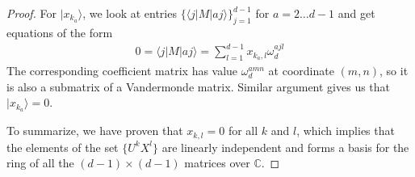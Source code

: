 \documentclass[11pt,letterpaper]{article}
\newcommand{\ket}[1]{|#1\rangle}
\newcommand{\bra}[1]{\langle#1|}
\newcommand{\ketbra}[2]{|#1\rangle\langle#2|}
\newcommand{\C}{\mathbb{C}}
\newcommand{\1}{\mathbb{1}}
\newcommand{\Pg}{\mathcal{P}}
\newcommand{\J}{\mathcal{J}}
\newcommand{\paulix}{\sigma_x}
\newcommand{\pauliz}{\sigma_z}
\newcommand{\G}[1]{G^{(#1)}}
\newcommand{\LS}{LS}
\theoremstyle{definition}
\begin{document}
\begin{proof}
For $\ket{x_{k_a}}$, we look at entries $\{\bra{j}M\ket{aj}\}_{j=1}^{d-1}$ for $a = 2 \dots d-1$ and get equations
of the form
\begin{align}
	0 = \bra{j}M\ket{aj} = \sum_{l=1}^{d-1} x_{k_a, l} \omega_d^{ajl} 
\end{align}
The corresponding coefficient matrix has value $\omega_d^{amn}$ at coordinate $(m,n)$,
so it is also a submatrix of a Vandermonde matrix. Similar argument gives us that $\ket{x_{k_a}} = 0$.

To summarize, we have proven that $x_{k,l} = 0$ for all $k$ and $l$, which implies that the elements of the set
$\{ U^k X^l \}$ are linearly independent and forms a basis for the ring of all the $(d-1)\times(d-1)$ matrices over $\C$.
\end{proof}
%
\end{document}
